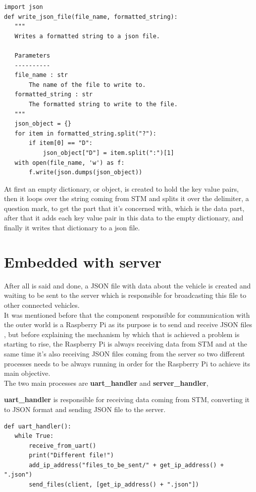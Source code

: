 \clearpage
\begin{lstlisting}
import json
def write_json_file(file_name, formatted_string):
   """
   Writes a formatted string to a json file.
 
   Parameters
   ----------
   file_name : str
       The name of the file to write to.
   formatted_string : str
       The formatted string to write to the file.
   """
   json_object = {}
   for item in formatted_string.split("?"):
       if item[0] == "D":
           json_object["D"] = item.split(":")[1]
   with open(file_name, 'w') as f:
       f.write(json.dumps(json_object))
\end{lstlisting}

At first an empty dictionary, or object, is created to hold the key value pairs, then it loops over the string coming from STM and splits it over the delimiter, a question mark, to get the part that it’s concerned with, which is the data part, after that it adds each key value pair in this data to the empty dictionary, and finally it writes that dictionary to a json file.

\section{Embedded with server}

After all is said and done, a JSON file with data about the vehicle is created and waiting to be sent to the server which is responsible for broadcasting this file to other connected vehicles.\\

It was mentioned before that the component responsible for communication with the outer world is a Raspberry Pi as its purpose is to send and receive JSON files , but before explaining the mechanism by which that is achieved a problem is starting to rise, the Raspberry Pi is always receiving data from STM and at the same time it’s also receiving JSON files coming from the server so two different processes needs to be always running in order for the Raspberry Pi to achieve its main objective.\\

The two main processes are \textbf{uart\_handler} and \textbf{server\_handler},

\textbf{uart\_handler} is responsible for receiving data coming from STM, converting it to JSON format and sending JSON file to the server.
\clearpage
\begin{lstlisting}
def uart_handler():
   while True:
       receive_from_uart()
       print("Different file!")
       add_ip_address("files_to_be_sent/" + get_ip_address() + ".json")
       send_files(client, [get_ip_address() + ".json"])
\end{lstlisting}

